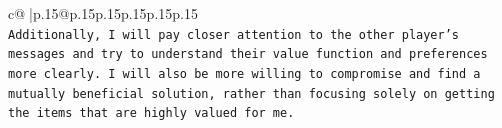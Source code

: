 \documentclass{article}
\begin{document}
{\begin{supertabular}{c@{$\;$}|p{.15\linewidth}@{}p{.15\linewidth}p{.15\linewidth}p{.15\linewidth}p{.15\linewidth}p{.15\linewidth}}
{{{\\ 
\texttt{Additionally, I will pay closer attention to the other player's messages and try to understand their value function and preferences more clearly. I will also be more willing to compromise and find a mutually beneficial solution, rather than focusing solely on getting the items that are highly valued for me.} \\
            }
        }
    }
     \\ \\

\end{supertabular}
}
\end{document}

